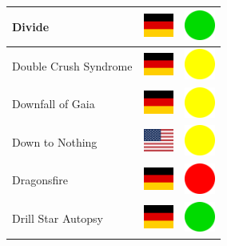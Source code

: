 \documentclass[12pt, a4paper, twoside]{report}
\begin{document}
\begin{center}
\begin{longtable}{|p{5cm}|p{2cm}|p{2cm}|}
Divide & \includegraphics[width=1cm]{4x3/de} & \includegraphics[width=1cm]{likes/y} \\ \hline
Double Crush Syndrome & \includegraphics[width=1cm]{4x3/de} & \includegraphics[width=1cm]{likes/m} \\ \hline
Downfall of Gaia & \includegraphics[width=1cm]{4x3/de} & \includegraphics[width=1cm]{likes/m} \\ \hline
Down to Nothing & \includegraphics[width=1cm]{4x3/us} & \includegraphics[width=1cm]{likes/m} \\ \hline
Dragonsfire & \includegraphics[width=1cm]{4x3/de} & \includegraphics[width=1cm]{likes/n} \\ \hline
Drill Star Autopsy & \includegraphics[width=1cm]{4x3/de} & \includegraphics[width=1cm]{likes/y} \\ \hline

\end{longtable}
\end{center}
\end{document}
